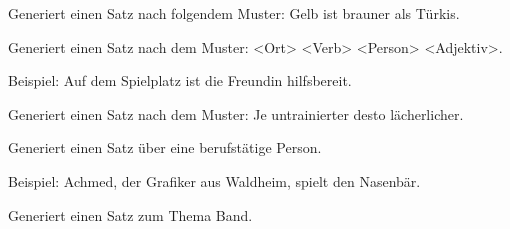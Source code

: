 \documentclass[a4paper,12pt,oneside]{sphinxmanual}
\begin{document}

\begin{fulllineitems}
\label{funktionen:pyzufall.satz_absurde_farbfunktion}
Generiert einen Satz nach folgendem Muster: Gelb ist brauner als Türkis.

\end{fulllineitems}


\begin{fulllineitems}
\label{funktionen:pyzufall.satz_adjektiv_am_ort}
Generiert einen Satz nach dem Muster: \textless{}Ort\textgreater{} \textless{}Verb\textgreater{} \textless{}Person\textgreater{} \textless{}Adjektiv\textgreater{}.

Beispiel: Auf dem Spielplatz ist die Freundin hilfsbereit.

\end{fulllineitems}


\begin{fulllineitems}
\label{funktionen:pyzufall.satz_adjektiv_sprichwort}
Generiert einen Satz nach dem Muster: Je untrainierter desto lächerlicher.

\end{fulllineitems}


\begin{fulllineitems}
\label{funktionen:pyzufall.satz_arbeit}
Generiert einen Satz über eine berufstätige Person.

Beispiel: Achmed, der Grafiker aus Waldheim, spielt den Nasenbär.

\end{fulllineitems}


\begin{fulllineitems}
\label{funktionen:pyzufall.satz_band}
Generiert einen Satz zum Thema Band.

\end{fulllineitems}
\end{document}
